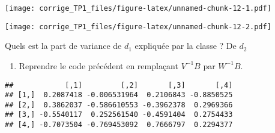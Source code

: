 \documentclass[
]{article}
\newenvironment{Shaded}{\begin{snugshade}}{\end{snugshade}}
\newcommand{\DataTypeTok}[1]{\textcolor[rgb]{0.13,0.29,0.53}{#1}}
\newcommand{\KeywordTok}[1]{\textcolor[rgb]{0.13,0.29,0.53}{\textbf{#1}}}
\newcommand{\NormalTok}[1]{#1}
\newcommand{\OperatorTok}[1]{\textcolor[rgb]{0.81,0.36,0.00}{\textbf{#1}}}
\newcommand{\StringTok}[1]{\textcolor[rgb]{0.31,0.60,0.02}{#1}}
\providecommand{\tightlist}{%
  \setlength{\itemsep}{0pt}\setlength{\parskip}{0pt}}
\begin{document}
\texttt{[image: corrige\_TP1\_files/figure-latex/unnamed-chunk-12-1.pdf]}

\begin{Shaded}
\end{Shaded}

\texttt{[image: corrige\_TP1\_files/figure-latex/unnamed-chunk-12-2.pdf]}

Quels est la part de variance de \(d_1\) expliquée par la classe ? De
\(d_2\)

\begin{enumerate}
\def\labelenumi{\arabic{enumi}.}
\setcounter{enumi}{19}
\tightlist
\item
  Reprendre le code précédent en remplaçant \(V^{-1}B\) par \(W^{-1}B\).
\end{enumerate}

\begin{Shaded}
\end{Shaded}

\begin{verbatim}
##            [,1]         [,2]       [,3]       [,4]
## [1,]  0.2087418 -0.006531964  0.2106843 -0.8850525
## [2,]  0.3862037 -0.586610553 -0.3962378  0.2969366
## [3,] -0.5540117  0.252561540 -0.4591404  0.2754433
## [4,] -0.7073504 -0.769453092  0.7666797  0.2294377
\end{verbatim}

\begin{Shaded}
\end{Shaded}
\end{document}
